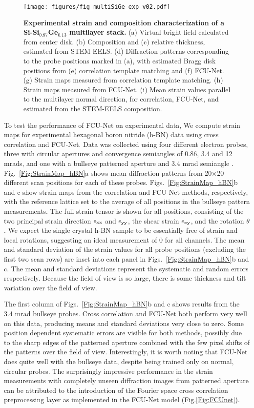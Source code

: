 \documentclass[%
 reprint,
superscriptaddress,
 amsmath,
 amssymb,
 prl,
]{revtex4-2}
\begin{document}
\begin{figure*}[htbp]
    \centering
    \texttt{[image: figures/fig\_multiSiGe\_exp\_v02.pdf]}
    \caption{{\bf Experimental strain and composition characterization of a Si-Si$_{0.87}$Ge$_{0.13}$ multilayer stack.} (a) Virtual bright field calculated from center disk. (b) Composition and (c) relative thickness, estimated from STEM-EELS. (d) Diffraction patterns corresponding to the probe positions marked in (a), with estimated Bragg disk positions from (e) correlation template matching and (f) FCU-Net. (g) Strain maps measured from correlation template matching. (h) Strain maps measured from FCU-Net. (i) Mean strain values parallel to the multilayer normal direction, for correlation, FCU-Net, and estimated from the STEM-EELS composition.}
    \label{Fig:StrainMap_exp}
\end{figure*}

To test the performance of FCU-Net on experimental data, We compute strain maps for experimental hexagonal boron nitride (h-BN) data using cross correlation and FCU-Net.  Data was collected using four different electron probes, three with circular apertures and convergence semiangles of 0.86, 3.4 and 12 mrads, and one with a bullseye patterned aperture and 3.4 mrad semiangle \citep{zeltmann2020patterned}.  Fig.~\ref{Fig:StrainMap_hBN}a shows mean diffraction patterns from 20$\times$20 different scan positions for each of these probes.  Figs.~\ref{Fig:StrainMap_hBN}b and c show strain maps from the correlation and FCU-Net methods, respectively, with the reference lattice set to the average of all positions in the bullseye pattern measurements. The full strain tensor is shown for all positions, consisting of the two principal strain direction $\epsilon_{\rm{xx}}$ and $\epsilon_{\rm{yy}}$, the shear strain $\epsilon_{\rm{xy}}$, and the rotation $\theta$. We expect the single crystal h-BN sample to be essentially free of strain and local rotations, suggesting an ideal measurement of 0 for all channels. The mean and standard deviation of the strain values for all probe positions (excluding the first two scan rows) are inset into each panel in Figs.~\ref{Fig:StrainMap_hBN}b and c. The mean and standard deviations represent the systematic and random errors respectively. Because the field of view is so large, there is some thickness and tilt variation over the field of view.

The first column of Figs.~\ref{Fig:StrainMap_hBN}b and c shows results from the 3.4 mrad bullseye probes.  Cross correlation and FCU-Net both perform very well on this data, producing means and standard deviations very close to zero.  Some position dependent systematic errors are visible for both methods, possibly due to the sharp edges of the patterned aperture combined with the few pixel shifts of the patterns over the field of view. Interestingly, it is worth noting that FCU-Net does quite well with the bullseye data, despite being trained only on normal, circular probes. The surprisingly impressive performance in the strain measurements with completely unseen diffraction images from patterned aperture can be attributed to the introduction of the Fourier space cross correlation preprocessing layer as implemented in the FCU-Net model (Fig.\ref{Fig:FCUnet}). 
\end{document}

